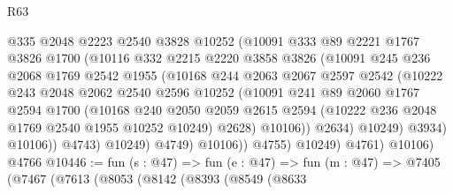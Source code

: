 \begin{lexlean}{R63}
\begin{coremodule}
                        @335
                        @2048
                        @2223
                        @2540
                        @3828
                        @10252
                        (@10091
                          @333
                          @89
                          @2221
                          @1767
                          @3826
                          @1700
                          (@10116
                            @332
                            @2215
                            @2220
                            @3858
                            @3826
                            (@10091
                              @245
                              @236
                              @2068
                              @1769
                              @2542
                              @1955
                              (@10168
                                @244
                                @2063
                                @2067
                                @2597
                                @2542
                                (@10222
                                  @243
                                  @2048
                                  @2062
                                  @2540
                                  @2596
                                  @10252
                                  (@10091
                                    @241
                                    @89
                                    @2060
                                    @1767
                                    @2594
                                    @1700
                                    (@10168
                                      @240
                                      @2050
                                      @2059
                                      @2615
                                      @2594
                                      (@10222 @236 @2048 @1769 @2540 @1955 @10252 @10249)
                                      @2628)
                                    @10106))
                                @2634)
                              @10249)
                            @3934)
                          @10106))
                      @4743)
                    @10249)
                  @4749)
                @10106))
            @4755)
          @10249)
        @4761)
      @10106)
    @4766
@10446 := fun (s : @47) =>
  fun (e : @47) =>
  fun (m : @47) =>
  @7405
    (@7467
      (@7613
        (@8053
          (@8142
            (@8393
              (@8549
                (@8633

\end{coremodule}
\end{lexlean}

